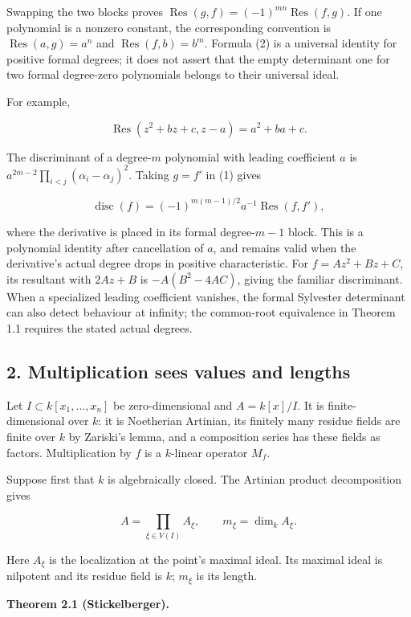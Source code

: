 \documentclass[
]{article}
\begin{document}
Swapping the two blocks proves
\(\operatorname{Res}(g,f)=(-1)^{mn}\operatorname{Res}(f,g)\). If one
polynomial is a nonzero constant, the corresponding convention is
\(\operatorname{Res}(a,g)=a^n\) and \(\operatorname{Res}(f,b)=b^m\).
Formula (2) is a universal identity for positive formal degrees; it does
not assert that the empty determinant one for two formal degree-zero
polynomials belongs to their universal ideal.

For example,

\[
\operatorname{Res}(z^2+bz+c,z-a)=a^2+ba+c.
\]

The discriminant of a degree-\(m\) polynomial with leading coefficient
\(a\) is \(a^{2m-2}\prod_{i<j}(\alpha_i-\alpha_j)^2\). Taking \(g=f'\)
in (1) gives

\[
\operatorname{disc}(f)=(-1)^{m(m-1)/2}a^{-1}\operatorname{Res}(f,f'),
\tag{3}
\]

where the derivative is placed in its formal degree-\(m-1\) block. This
is a polynomial identity after cancellation of \(a\), and remains valid
when the derivative's actual degree drops in positive characteristic.
For \(f=Az^2+Bz+C\), its resultant with \(2Az+B\) is \(-A(B^2-4AC)\),
giving the familiar discriminant. When a specialized leading coefficient
vanishes, the formal Sylvester determinant can also detect behaviour at
infinity; the common-root equivalence in Theorem 1.1 requires the stated
actual degrees.

\subsection{2. Multiplication sees values and
lengths}\label{multiplication-sees-values-and-lengths}

Let \(I\subset k[x_1,\ldots,x_n]\) be zero-dimensional and \(A=k[x]/I\).
It is finite-dimensional over \(k\): it is Noetherian Artinian, its
finitely many residue fields are finite over \(k\) by Zariski's lemma,
and a composition series has these fields as factors. Multiplication by
\(f\) is a \(k\)-linear operator \(M_f\).

Suppose first that \(k\) is algebraically closed. The Artinian product
decomposition gives

\[
A=\prod_{\xi\in V(I)}A_\xi,
\qquad m_\xi=\dim_k A_\xi.
\]

Here \(A_\xi\) is the localization at the point's maximal ideal. Its
maximal ideal is nilpotent and its residue field is \(k\); \(m_\xi\) is
its length.

\textbf{Theorem 2.1 (Stickelberger).}
\end{document}
